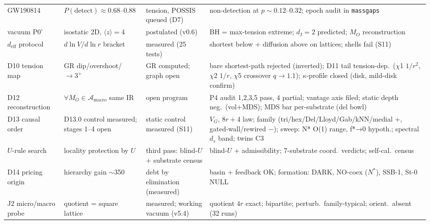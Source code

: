 \documentclass[11pt]{article}
\begin{document}
\begin{table}[ht]
\begin{tabular}{@{}p{3.4cm} p{3.4cm} p{2.6cm} p{4.4cm}@{}}
GW190814 & $P(\mathrm{detect}) \approx 0.68$--$0.88$ & tension, POSSIS queued (D7) & non-detection at $p \sim 0.12$--$0.32$; epoch audit in \texttt{massgaps} \\
vacuum P0' & isostatic 2D, $\langle z\rangle = 4$ & postulated (v0.6) & BH = max-tension extreme; $d_I = 2$ predicted; $M_O$ reconstruction \\
$d_{\mathrm{eff}}$ protocol & $d\ln V/d\ln r$ bracket & measured (25 tests) & shortest below + diffusion above on lattices; shells fail (S11) \\
D10 tension map & GR dip/overshoot/$\to3^+$ & GR computed; graph open & bare shortest-path rejected (inverted); D11 tail tension-dep.\ ($\chi$1 $1/r^2$, $\chi$2 $1/r$, $\chi$5 crossover $q{\to}1.1$); $\kappa$-profile closed (disk, mild-disk confirm) \\
D12 reconstruction & $\forall M_O \in \mathcal{A}_{\mathrm{macro}}$ same IR & open program & P4 audit 1,2,3,5 pass, 4 partial; vantage axis filed; static depth neg.\ (vol+MDS); MDS bar per-substrate (del bowl) \\
D13 causal order & D13.0 control measured; stages 1--4 open & static control measured (S11) & $V_G$, $8r{+}4$ law; family (tri/hex/Del/Lloyd/Gab/kNN/medial +, gated-wall/rewired $-$); sweep: N* O(1) range, f*→0 hypoth.; spectral $d_s$ band; twins C3 \\
$U$-rule search & locality protection by $U$ & third pass: blind-$U$ + substrate census & blind-$U$ + admissibility; 7-substrate coord.\ verdicts; self-cal.\ census \\
D14 pricing origin & hierarchy gain $\sim$350 & debt by elimination (measured) & basin + feedback OK; formation: DARK, NO-coex ($N^*$), SSB-1, St-0 NULL \\
J2 micro/macro probe & quotient = square lattice & measured; working vacuum (v5.4) & quotient $4r$ exact; bipartite; perturb.\ family-typical; orient.\ absent (32 runs) \\\bottomrule
\end{tabular}
\end{table}
\end{document}
